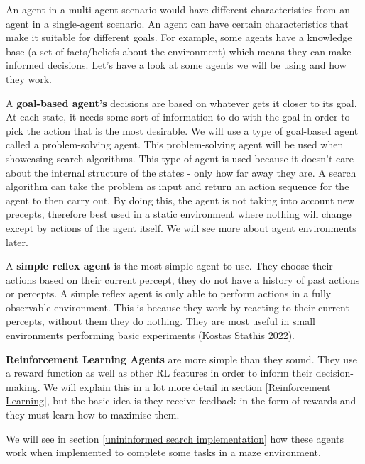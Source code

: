 \documentclass[]{final_report}
\begin{document}
An agent in a multi-agent scenario would have different characteristics from an agent in a single-agent scenario. An agent can have certain characteristics that make it suitable for different goals. For example, some agents have a knowledge base (a set of facts/beliefs about the environment) which means they can make informed decisions. Let's have a look at some agents we will be using and how they work.

A \textbf{goal-based agent's} decisions are based on whatever gets it closer to its goal. At each state, it needs some sort of information to do with the goal in order to pick the action that is the most desirable. We will use a type of goal-based agent called a problem-solving agent. This problem-solving agent will be used when showcasing search algorithms. This type of agent is used because it doesn't care about the internal structure of the states - only how far away they are. A search algorithm can take the problem as input and return an action sequence for the agent to then carry out. By doing this, the agent is not taking into account new precepts, therefore best used in a static environment where nothing will change except by actions of the agent  itself\cite{russell2016artificial}. We will see more about agent environments later. 

A \textbf{simple reflex agent} is the most simple agent to use. They choose their actions based on their current percept, they do not have a history of past actions or percepts. A simple reflex agent is only able to perform actions in a fully observable environment. This is because they work by reacting to their current percepts, without them they do nothing. They are most useful in small environments performing basic experiments (Kostas Stathis 2022).

\textbf{Reinforcement Learning Agents} are more simple than they sound. They use a reward function as well as other RL features in order to inform their decision-making. We will explain this in a lot more detail in section \ref{Reinforcement Learning}, but the basic idea is they receive feedback in the form of rewards and they must learn how to maximise them.

We will see in section \ref{unininformed search implementation} how these agents work when implemented to complete some tasks in a maze environment. 
\end{document}
